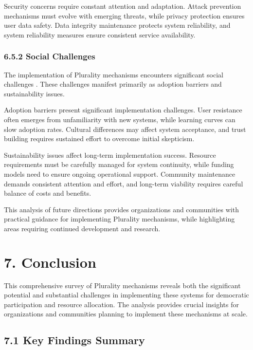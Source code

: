 Security concerns require constant attention and adaptation. Attack prevention mechanisms must evolve with emerging threats, while privacy protection ensures user data safety. Data integrity maintenance protects system reliability, and system reliability measures ensure consistent service availability.

\hypertarget{social-challenges}{%
\subsubsection{6.5.2 Social Challenges}\label{social-challenges}}

The implementation of Plurality mechanisms encounters significant social challenges \citep{weyl2022decentralized}. These challenges manifest primarily as adoption barriers and sustainability issues.

Adoption barriers present significant implementation challenges. User resistance often emerges from unfamiliarity with new systems, while learning curves can slow adoption rates. Cultural differences may affect system acceptance, and trust building requires sustained effort to overcome initial skepticism.

Sustainability issues affect long-term implementation success. Resource requirements must be carefully managed for system continuity, while funding models need to ensure ongoing operational support. Community maintenance demands consistent attention and effort, and long-term viability requires careful balance of costs and benefits.

This analysis of future directions provides organizations and communities with practical guidance for implementing Plurality mechanisms, while highlighting areas requiring continued development and research.

\hypertarget{conclusion}{%
\section{7. Conclusion}\label{conclusion}}

This comprehensive survey of Plurality mechanisms reveals both the significant potential and substantial challenges in implementing these systems for democratic participation and resource allocation. The analysis provides crucial insights for organizations and communities planning to implement these mechanisms at scale.

\hypertarget{key-findings-summary}{%
\subsection{7.1 Key Findings Summary}\label{key-findings-summary}}

